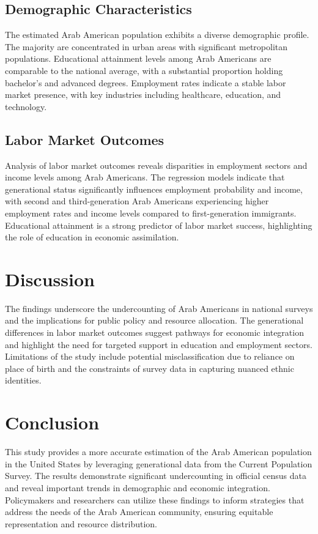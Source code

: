 \subsection{Demographic Characteristics}\label{subsec:demographic_characteristics}

The estimated Arab American population exhibits a diverse demographic profile. The majority are concentrated in urban areas with significant metropolitan populations. Educational attainment levels among Arab Americans are comparable to the national average, with a substantial proportion holding bachelor's and advanced degrees. Employment rates indicate a stable labor market presence, with key industries including healthcare, education, and technology.

\subsection{Labor Market Outcomes}\label{subsec:labor_market_outcomes}

Analysis of labor market outcomes reveals disparities in employment sectors and income levels among Arab Americans. The regression models indicate that generational status significantly influences employment probability and income, with second and third-generation Arab Americans experiencing higher employment rates and income levels compared to first-generation immigrants. Educational attainment is a strong predictor of labor market success, highlighting the role of education in economic assimilation.

\section{Discussion}\label{sec:discussion}

The findings underscore the undercounting of Arab Americans in national surveys and the implications for public policy and resource allocation. The generational differences in labor market outcomes suggest pathways for economic integration and highlight the need for targeted support in education and employment sectors. Limitations of the study include potential misclassification due to reliance on place of birth and the constraints of survey data in capturing nuanced ethnic identities.

\section{Conclusion}\label{sec:conclusion}

This study provides a more accurate estimation of the Arab American population in the United States by leveraging generational data from the Current Population Survey. The results demonstrate significant undercounting in official census data and reveal important trends in demographic and economic integration. Policymakers and researchers can utilize these findings to inform strategies that address the needs of the Arab American community, ensuring equitable representation and resource distribution.

